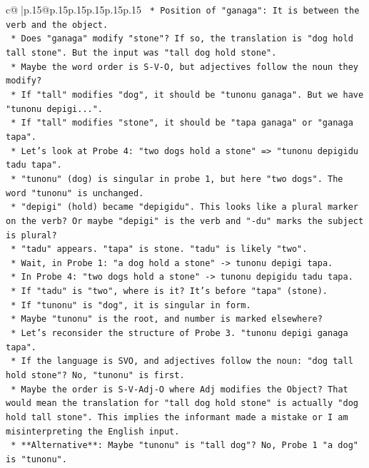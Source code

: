 \documentclass{article}
\begin{document}
{\begin{supertabular}{c@{$\;$}|p{.15\linewidth}@{}p{.15\linewidth}p{.15\linewidth}p{.15\linewidth}p{.15\linewidth}p{.15\linewidth}}
{{{\texttt{    *   Position of "ganaga": It is between the verb and the object.} \\
\texttt{    *   Does "ganaga" modify "stone"? If so, the translation is "dog hold tall stone". But the input was "tall dog hold stone".} \\
\texttt{    *   Maybe the word order is S{-}V{-}O, but adjectives follow the noun they modify?} \\
\texttt{        *   If "tall" modifies "dog", it should be "tunonu ganaga". But we have "tunonu depigi...".} \\
\texttt{        *   If "tall" modifies "stone", it should be "tapa ganaga" or "ganaga tapa".} \\
\texttt{    *   Let's look at Probe 4: "two dogs hold a stone" => "tunonu depigidu tadu tapa".} \\
\texttt{        *   "tunonu" (dog) is singular in probe 1, but here "two dogs". The word "tunonu" is unchanged.} \\
\texttt{        *   "depigi" (hold) became "depigidu". This looks like a plural marker on the verb? Or maybe "depigi" is the verb and "{-}du" marks the subject is plural?} \\
\texttt{        *   "tadu" appears. "tapa" is stone. "tadu" is likely "two".} \\
\texttt{        *   Wait, in Probe 1: "a dog hold a stone" {-}> tunonu depigi tapa.} \\
\texttt{        *   In Probe 4: "two dogs hold a stone" {-}> tunonu depigidu tadu tapa.} \\
\texttt{        *   If "tadu" is "two", where is it? It's before "tapa" (stone).} \\
\texttt{        *   If "tunonu" is "dog", it is singular in form.} \\
\texttt{        *   Maybe "tunonu" is the root, and number is marked elsewhere?} \\
\texttt{        *   Let's reconsider the structure of Probe 3. "tunonu depigi ganaga tapa".} \\
\texttt{        *   If the language is SVO, and adjectives follow the noun: "dog tall hold stone"? No, "tunonu" is first.} \\
\texttt{        *   Maybe the order is S{-}V{-}Adj{-}O where Adj modifies the Object? That would mean the translation for "tall dog hold stone" is actually "dog hold tall stone". This implies the informant made a mistake or I am misinterpreting the English input.} \\
\texttt{        *   **Alternative**: Maybe "tunonu" is "tall dog"? No, Probe 1 "a dog" is "tunonu".} \\
}}}
\end{supertabular}}
\end{document}
